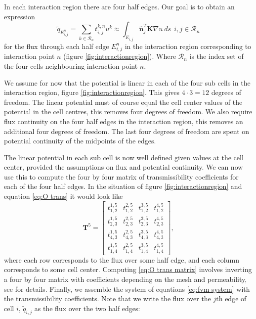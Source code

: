 \documentclass[../Main/main.tex]{subfiles}
\begin{document}
	In each interaction region there are four half edges. Our goal is to obtain an expression 
	\begin{equation}\label{eq:O trans}
		\tilde{q}_{E_{i,j}^n}  = \sum_{k\in \mathcal{R}_n} t^{k,n}_{i,j} u^k  \approx \int_{E_{i,j}}\hat{\bm{n}}_j^T \bm{K} \nabla u \  ds \ \ i,j \in \mathcal{R}_n
	\end{equation}
	for the flux through each half edge $E_{i,j}^n$ in the interaction region corresponding to interaction point $n$ (figure \ref{fig:interactionregion}). Where $\mathcal{R}_n$ is the index set of the four cells neighbouring interaction point $n$.
	\par
	We assume for now that the potential is linear in each of the four sub cells in the interaction region, figure  \ref{fig:interactionregion}. This gives $4\cdot 3 = 12$ degrees of freedom. The linear potential must of course equal the cell center values of the potential in the cell centres, this removes four degrees of freedom. We also require flux continuity on the four half edges in the interaction region, this removes an additional four degrees of freedom. The last four degrees of freedom are spent on potential continuity of the midpoints of the edges. 
	\par
	The linear potential in each sub cell is now well defined given values at the cell center, provided the assumptions on flux and potential continuity. We can now use this to compute the four by four matrix of transmissibility coefficients for each of the four half edges. In the situation of figure \ref{fig:interactionregion} and equation \eqref{eq:O trans} it would look like
	\begin{equation}\label{eq:O trans matrix}
		\bm{T}^5 = \begin{bmatrix}
			t^{1,5}_{1,2} &t^{2,5}_{1,2} &t^{3,5}_{1,2}  &t^{4,5}_{1,2} \\ 
			t^{1,5}_{2,3} &t^{2,5}_{2,3}  &t^{3,5}_{2,3}  &t^{4,5}_{2,3} \\ 
			t^{1,5}_{4,3} & t^{2,5}_{4,3} & t^{3,5}_{4,3} & t^{4,5}_{4,3}\\ 
			t^{1,5}_{1,4} & t^{2,5}_{1,4} & t^{3,5}_{1,4} & t^{4,5}_{1,4}
		\end{bmatrix},
	\end{equation}
where each row corresponds to the flux over some half edge, and each column corresponds to some cell center.
Computing \eqref{eq:O trans matrix} involves inverting a four by four matrix with coefficients depending on the mesh and permeability, see \cite{Aavatsmark2002} for details. Finally, we assemble the system of equations \eqref{eq:fvm system} with the transmissibility coefficients. Note that we write the flux over the $j$th edge of cell $i$, $\tilde{q}_{i,j}$ as the flux over the two half edges:
\end{document}
